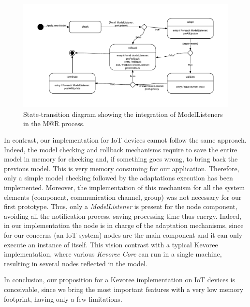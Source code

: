 \begin{figure}[]
	\centering
	\includegraphics[width=1\columnwidth]{chapters/modelsAtRuntimeContiki.images/ModelListenerStateChart.pdf}
	\caption{State-transition diagram showing the integration of ModelListeners in the M@R process.}
	\label{fig:MAR_modelListener}
\end{figure}

In contrast, our implementation for IoT devices cannot follow the same approach.
Indeed, the model checking and rollback mechanisms require to save the entire model in memory for checking and, if something goes wrong, to bring back the previous model.
This is very memory consuming for our application.
Therefore, only a simple model checking followed by the adaptations execution has been implemented.
Moreover, the implementation of this mechanism for all the system elements (component, communication channel, group) was not necessary for our first prototype.
Thus, only a \textit{ModelListener} is present for the node component, avoiding all the notification process, saving processing time thus energy.
Indeed, in our implementation the node is in charge of the adaptation mechanisms, since for our concerns (an IoT system) nodes are the main component and it can only execute an instance of itself.
This vision contrast with a typical Kevoree implementation, where various \textit{Kevoree Core} can run in a single machine, resulting in several nodes reflected in the model.

In conclusion, our proposition for a Kevoree implementation on IoT devices is conceivable, since we bring the most important features with a very low memory footprint, having only a few limitations.


